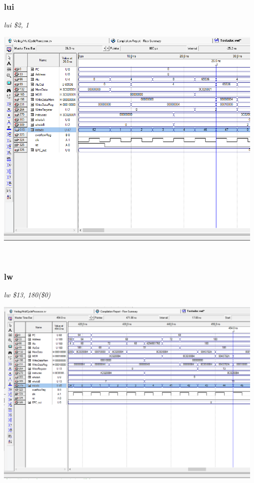 \documentclass{article}
\begin{document}
    \subsubsection{lui}
    {\it lui \$2, 1}\\
    \begin{center}
        \includegraphics[scale=0.25]{lui.PNG}
    \end{center}
    
    \\
    \subsubsection{lw}
    {\it lw \$13, 180(\$0)}\\
    \begin{center}
        \includegraphics[scale=0.25]{lw.PNG}
    \end{center}
    
\end{document}
